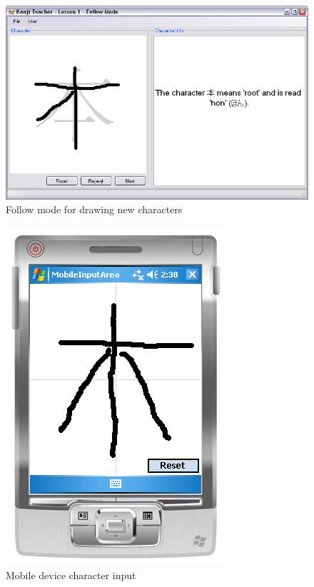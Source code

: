 \begin{figure}[htbp]
\begin{center}
\includegraphics[scale=0.7]{images/ConceptualDesign/followMode.png}
\caption{Follow mode for drawing new characters}
\label{fig:followMode}
\end{center}
\end{figure}


\begin{figure}[htbp]
\begin{center}
\includegraphics[scale=0.6]{images/ConceptualDesign/mobileDeviceInput.png}
\caption{Mobile device character input}
\label{fig:mobileDeviceInput}
\end{center}
\end{figure}

